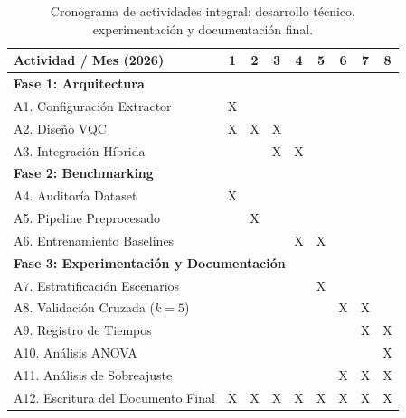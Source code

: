 \documentclass[12pt,letterpaper]{article}
\begin{document}
    \begin{table}[H]
        \centering
        \small
        \begin{tabularx}{\textwidth}{|X|c|c|c|c|c|c|c|c|}
        \hline
        \rowcolor{lightgray} \centering \textbf{Actividad / Mes (2026)} & \textbf{1} & \textbf{2} & \textbf{3} & \textbf{4} & \textbf{5} & \textbf{6} & \textbf{7} & \textbf{8} \\ \hline
        \multicolumn{9}{|l|}{\cellcolor{lightgray!50}\textbf{Fase 1: Arquitectura}} \\ \hline
        A1. Configuración Extractor & \cellcolor{blue!20}X & & & & & & & \\ \hline
        A2. Diseño VQC & \cellcolor{blue!20}X & \cellcolor{blue!20}X & \cellcolor{blue!20}X & & & & & \\ \hline
        A3. Integración Híbrida & & & \cellcolor{blue!20}X & \cellcolor{blue!20}X & & & & \\ \hline
        \multicolumn{9}{|l|}{\cellcolor{lightgray!50}\textbf{Fase 2: Benchmarking}} \\ \hline
        A4. Auditoría Dataset & \cellcolor{blue!20}X & & & & & & & \\ \hline
        A5. Pipeline Preprocesado & & \cellcolor{blue!20}X & & & & & & \\ \hline
        A6. Entrenamiento Baselines & & & & \cellcolor{blue!20}X & \cellcolor{blue!20}X & & & \\ \hline
        \multicolumn{9}{|l|}{\cellcolor{lightgray!50}\textbf{Fase 3: Experimentación y Documentación}} \\ \hline
        A7. Estratificación Escenarios & & & & & \cellcolor{blue!20}X & & & \\ \hline
        A8. Validación Cruzada ($k=5$) & & & & & & \cellcolor{blue!20}X & \cellcolor{blue!20}X & \\ \hline
        A9. Registro de Tiempos & & & & & & & \cellcolor{blue!20}X & \cellcolor{blue!20}X \\ \hline
        A10. Análisis ANOVA & & & & & & & & \cellcolor{blue!20}X \\ \hline
        A11. Análisis de Sobreajuste & & & & & & \cellcolor{blue!20}X & \cellcolor{blue!20}X & \cellcolor{blue!20}X \\ \hline
        A12. Escritura del Documento Final & \cellcolor{blue!20}X & \cellcolor{blue!20}X & \cellcolor{blue!20}X & \cellcolor{blue!20}X & \cellcolor{blue!20}X & \cellcolor{blue!20}X & \cellcolor{blue!20}X & \cellcolor{blue!20}X \\ \hline
        \end{tabularx}
        \caption{Cronograma de actividades integral: desarrollo técnico, experimentación y documentación final.}
        \label{tab:cronograma}
    \end{table}
\end{document}
